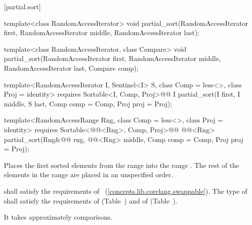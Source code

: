 [partial.sort]{}

%
\begin{removedblock}
\begin{itemdecl}
template<class RandomAccessIterator>
  void partial_sort(RandomAccessIterator first,
                    RandomAccessIterator middle,
                    RandomAccessIterator last);

template<class RandomAccessIterator, class Compare>
  void partial_sort(RandomAccessIterator first,
                    RandomAccessIterator middle,
                    RandomAccessIterator last,
                    Compare comp);
\end{itemdecl}
\end{removedblock}
\begin{addedblock}
\begin{itemdecl}
template<RandomAccessIterator I, Sentinel<I> S, class Comp = less<>,
    class Proj = identity>
  requires Sortable<I, Comp, Proj>@\newtxt{()}@
  I partial_sort(I first, I middle, S last, Comp comp = Comp{}, Proj proj = Proj{});

template<RandomAccessRange Rng, class Comp = less<>, class Proj = identity>
  requires Sortable<@@<Rng>, Comp, Proj>@\newtxt{()}@
  @@<Rng>
    partial_sort(Rng&@\newtxt{\&}@ rng, @@<Rng> middle, Comp comp = Comp{},
                 Proj proj = Proj{});
\end{itemdecl}
\end{addedblock}

\begin{itemdescr}
\pnum
\effects
Places the first
sorted elements from the range
into the range
.
The rest of the elements in the range
are placed in an unspecified order.
%

\begin{removedblock}
\pnum
\requires
{} shall satisfy the requirements of
~(\ref{concepts.lib.corelang.swappable}). The type
of  shall satisfy the requirements of
 (Table~) and of
 (Table~).
\end{removedblock}

\pnum
\complexity
It takes approximately
comparisons.
\end{itemdescr}

